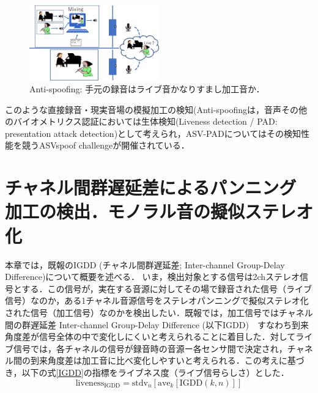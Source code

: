 \documentclass[technicalreport]{ieicej}
\begin{document}
\begin{figure}[tbh]
	\centering
	\includegraphics[width=0.5\textwidth]{fig/Anti-spoofing.png}
	\caption{Anti-spoofing: 手元の録音はライブ音かなりすまし加工音か．}
	\label{fig:Anti-Spoofing}
\end{figure}
%　　　　　　　　　　　　　　　　　　　　　　　　　　


このような直接録音・現実音場の模擬加工の検知(Anti-spoofingは，音声その他のバイオメトリクス認証においては生体検知(Liveness detection / PAD: presentation attack detection\cite{ISO/IEC30107-1:2016})として考えられ，ASV-PADについてはその検知性能を競うASVspoof challenge\cite{ASVspoof,ASVspoof2015,ASVspoof2017}が開催されている． 

\section{チャネル間群遅延差によるパンニング加工の検出．モノラル音の擬似ステレオ化}
本章では，既報\cite{kuroda_EMM201903}のIGDD (チャネル間群遅延差; Inter-channel Group-Delay Difference)について概要を述べる．
いま，検出対象とする信号は2chステレオ信号とする．この信号が，実在する音源に対してその場で録音された信号（ライブ信号）なのか，ある1チャネル音源信号をステレオパンニングで擬似ステレオ化された信号（加工信号）なのかを検出したい．既報では，加工信号ではチャネル間の群遅延差 Inter-channel Group-Delay Difference (以下IGDD)　すなわち到来角度差が信号全体の中で変化しにくいと考えられることに着目した．対してライブ信号では，各チャネルの信号が録音時の音源ー各センサ間で決定され，チャネル間の到来角度差は加工音に比べ変化しやすいと考えられる．この考えに基づき，以下の式\eqref{IGDD}の指標をライブネス度（ライブ信号らしさ）とした．
\begin{equation}
	\mbox{liveness}_{\mbox{IGDD}} = \mbox{stdv}_n\left[ \mbox{ave}_k[ \mbox{IGDD}(k,n)] \right] \label{IGDD}
\end{equation}
\end{document}
